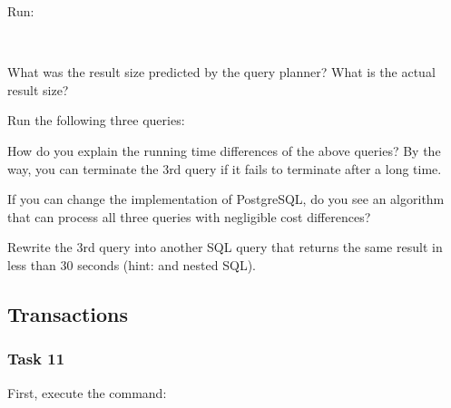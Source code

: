 \noindent Run:

\vgap

\noindent {} \\

\vgap

\noindent What was the result size predicted by the query planner? What is the actual result size?

\vgap

\noindent Run the following three queries:


\noindent How do you explain the running time differences of the above queries? By the way, you can terminate the 3rd query if it fails to terminate after a long time.

\vgap

\noindent If you can change the implementation of PostgreSQL, do you see an algorithm that can process all three queries with negligible cost differences?

\vgap

Rewrite the 3rd query into another SQL query that returns the same result in less than 30 seconds (hint:  and nested SQL).


\subsection{Transactions}

\subsubsection{Task 11}

First, execute the command:

\vgap

\noindent
{}

